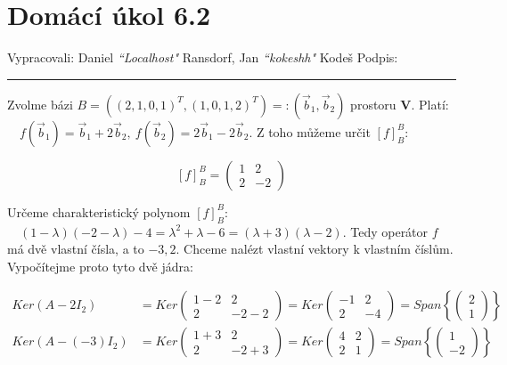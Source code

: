 \documentclass[12pt]{article}
\begin{document}
\section*{Domácí úkol 6.2}

Vypracovali: Daniel \textit{``Localhost"} Ransdorf, Jan \textit{``kokeshh"} Kodeš \hfill Podpis: \rule{4cm}{0.4pt}


\bigskip

Zvolme bázi $B=\left((2,1,0,1)^T, (1,0,1,2)^T\right) =: \left(\vec{b}_1,\vec{b}_2\right)$ prostoru \textbf{V}.
Platí: $\quad f(\vec{b}_1) = \vec{b}_1 + 2\vec{b}_2,\ f(\vec{b}_2) = 2\vec{b}_1 - 2\vec{b}_2$.
Z toho můžeme určit $[f]^B_B$:

\[
[f]^B_B = \left(\begin{array}{cc}
  1 & 2 \\
  2 & -2
\end{array}\right)
\]

Určeme charakteristický polynom $[f]^B_B$: $\quad (1-\lambda)(-2-\lambda) - 4 = \lambda^2 + \lambda - 6 = (\lambda+3)(\lambda-2)$.
Tedy operátor $f$ má dvě vlastní čísla, a to $-3,2$. Chceme nalézt vlastní vektory k vlastním číslům. Vypočítejme
proto tyto dvě jádra:

\begin{align*}
Ker(A - 2 I_2) &= Ker\left(\begin{array}{cc}
  1-2 & 2 \\
  2 & -2-2
\end{array}\right) = Ker\left(\begin{array}{cc}
  -1 & 2 \\
  2 & -4
\end{array}\right) = Span\left\{\left(\begin{array}{c}2\\1\end{array}\right)\right\} \\
Ker(A - (-3) I_2) &= Ker\left(\begin{array}{cc}
  1+3 & 2 \\
  2 & -2+3
\end{array}\right) = Ker\left(\begin{array}{cc}
  4 & 2 \\
  2 & 1
\end{array}\right) = Span\left\{\left(\begin{array}{c}1\\-2\end{array}\right)\right\}
\end{align*}
\end{document}
